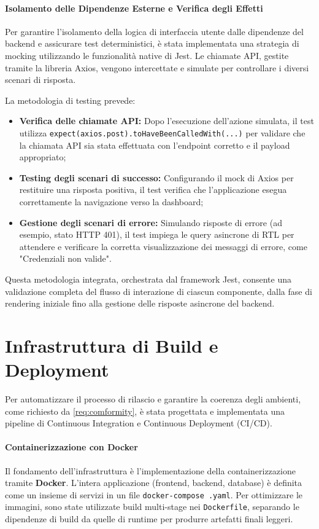 \documentclass[12pt,a4paper,openright,twoside]{book}
\begin{document}
\paragraph{Isolamento delle Dipendenze Esterne e Verifica degli Effetti}

Per garantire l'isolamento della logica di interfaccia utente dalle dipendenze del backend e assicurare test deterministici, è stata implementata una strategia di mocking utilizzando le funzionalità native di Jest. Le chiamate API, gestite tramite la libreria Axios, vengono intercettate e simulate per controllare i diversi scenari di risposta.

La metodologia di testing prevede:
\begin{itemize}
    \item \textbf{Verifica delle chiamate API:} Dopo l'esecuzione dell'azione simulata, il test utilizza \texttt{expect(\allowbreak axios.post)\allowbreak .toHaveBeenCalledWith(...)} per validare che la chiamata API sia stata effettuata con l'endpoint corretto e il payload appropriato;
    \item \textbf{Testing degli scenari di successo:} Configurando il mock di Axios per restituire una risposta positiva, il test verifica che l'applicazione esegua correttamente la navigazione verso la dashboard;
    \item \textbf{Gestione degli scenari di errore:} Simulando risposte di errore (ad esempio, stato HTTP 401), il test impiega le query asincrone di RTL per attendere e verificare la corretta visualizzazione dei messaggi di errore, come "Credenziali non valide".
\end{itemize}

Questa metodologia integrata, orchestrata dal framework Jest, consente una validazione completa del flusso di interazione di ciascun componente, dalla fase di rendering iniziale fino alla gestione delle risposte asincrone del backend.

\section{Infrastruttura di Build e Deployment}
\label{sec:impl_cicd}
Per automatizzare il processo di rilascio e garantire la coerenza degli ambienti, come richiesto da \ref{req:comformity}, è stata progettata e implementata una pipeline di Continuous Integration e Continuous Deployment (CI/CD).

\paragraph{Containerizzazione con Docker}
Il fondamento dell'infrastruttura è l'implementazione della containerizzazione tramite \textbf{Docker}. L'intera applicazione (frontend, backend, database) è definita come un insieme di servizi in un file \texttt{docker-\allowbreak compose \allowbreak.yaml}. Per ottimizzare le immagini, sono state utilizzate build multi-stage nei \texttt{Dockerfile}, separando le dipendenze di build da quelle di runtime per produrre artefatti finali leggeri.
\end{document}
